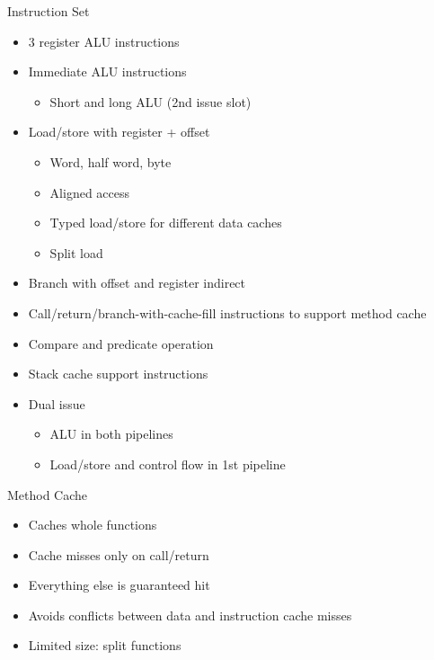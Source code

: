 \documentclass[17pt]{beamer}
\begin{document}
\begin{frame}[allowframebreaks]{Instruction Set}
  \begin{itemize}
  \item 3 register ALU instructions
  \item Immediate ALU instructions
    \begin{itemize}
    \item Short and long ALU (2nd issue slot)
    \end{itemize}
  \item Load/store with register + offset
    \begin{itemize}
    \item Word, half word, byte
    \item Aligned access
    \item Typed load/store for different data caches
    \item Split load
    \end{itemize}
    \framebreak
  \item Branch with offset and register indirect
  \item Call/return/branch-with-cache-fill instructions to support method cache
  \item Compare and predicate operation
  \item Stack cache support instructions
  \item Dual issue
    \begin{itemize}
    \item ALU in both pipelines
    \item Load/store and control flow in 1st pipeline      
    \end{itemize}
  \end{itemize}
\end{frame}

\begin{frame}{Method Cache}
  \begin{itemize}
  \item Caches whole functions
  \item Cache misses only on call/return
  \item Everything else is guaranteed hit
  \item Avoids conflicts between data and instruction cache misses
  \item Limited size: split functions
  \end{itemize}
\end{frame}
\end{document}

